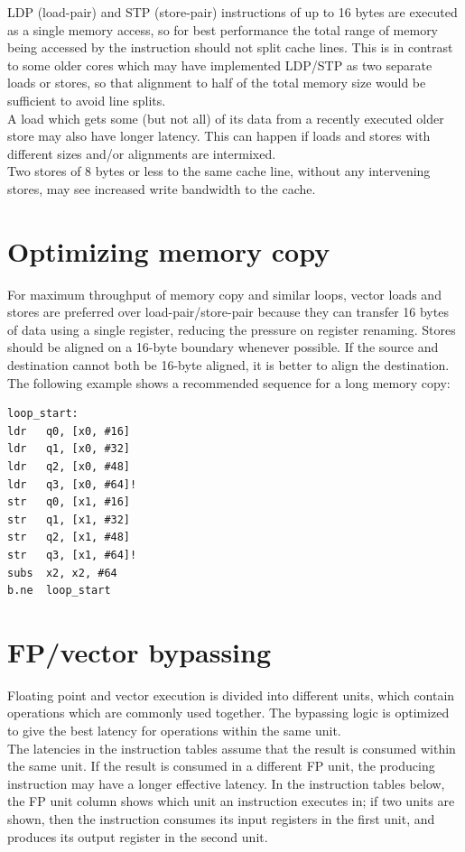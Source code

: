 \documentclass{article}
\begin{document}
LDP (load-pair) and STP (store-pair) instructions of up to 16 bytes
are executed as a single memory access, so for best performance the
total range of memory being accessed by the instruction should not
split cache lines. This is in contrast to some older cores which may
have implemented LDP/STP as two separate loads or stores, so that
alignment to half of the total memory size would be sufficient to
avoid line splits. \\

A load which gets some (but not all) of its data from a recently
executed older store may also have longer latency. This can happen if
loads and stores with different sizes and/or alignments are
intermixed. \\

Two stores of 8 bytes or less to the same cache line, without any
intervening stores, may see increased write bandwidth to the cache.

\section{Optimizing memory copy}

For maximum throughput of memory copy and similar loops, vector loads
and stores are preferred over load-pair/store-pair because they can
transfer 16 bytes of data using a single register, reducing the
pressure on register renaming. Stores should be aligned on a 16-byte
boundary whenever possible. If the source and destination cannot both
be 16-byte aligned, it is better to align the destination. The
following example shows a recommended sequence for a long memory copy:
\begin{verbatim}
loop_start:
ldr   q0, [x0, #16]
ldr   q1, [x0, #32]
ldr   q2, [x0, #48]
ldr   q3, [x0, #64]!
str   q0, [x1, #16]
str   q1, [x1, #32]
str   q2, [x1, #48]
str   q3, [x1, #64]!
subs  x2, x2, #64
b.ne  loop_start
\end{verbatim}

\section{FP/vector bypassing}

Floating point and vector execution is divided into different units,
which contain operations which are commonly used together. The
bypassing logic is optimized to give the best latency for operations
within the same unit. \\

The latencies in the instruction tables assume that the result is
consumed within the same unit. If the result is consumed in a
different FP unit, the producing instruction may have a longer
effective latency. In the instruction tables below, the FP unit column
shows which unit an instruction executes in; if two units are shown,
then the instruction consumes its input registers in the first unit,
and produces its output register in the second unit. \\
\end{document}
